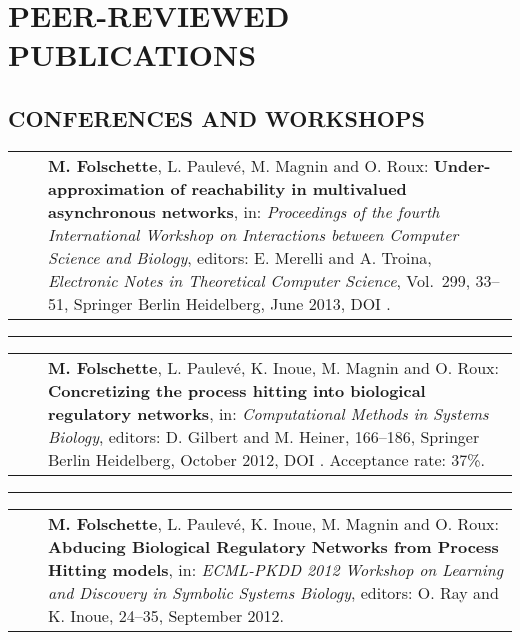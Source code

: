 \documentclass[11pt,a4paper,sans]{moderncv} %
\makeatletter
\renewcommand{\emph}{\textbf}
\newcommand{\myrule}{\vspace*{-2pt}\textcolor{color3}{\rule{\textwidth}{.5pt}}\vspace*{1pt}}
\newcommand{\mybluerule}{\vspace*{5pt}\textcolor{color1}{\rule{\textwidth}{.5pt}}\vspace*{-2pt}}
\newlength{\listitemsymbolwidthsep}
\newenvironment{publist}%
{\begin{tabular}{r@{}p{.935\textwidth}}\hspace{-\listitemsymbolwidthsep}\hspace{.45\hintscolumnwidth}}%
{\end{tabular}}
\newcommand{\newpub}[1]{\vspace{1pt}\begin{publist}\listitemsymbol~~&#1\end{publist}\vspace{1pt}}
\newenvironment{cvsplitsection}[1]{%
  \vspace{1cm}
  \section{#1}%
}{}
\newenvironment{cvsection}[1]{%
  \vspace{1cm}
  \begin{minipage}{\textwidth}
  \section{#1}%
}{%
  \end{minipage}
}
\newenvironment{cvsubsection}[1]{%
  \begin{minipage}{\textwidth}
  \subsection{#1}%
}{%
  \end{minipage}
}
\newcommand{\vol}{Vol.\ }
\makeatother
\begin{document}
\begin{cvsplitsection}{PEER-REVIEWED PUBLICATIONS}

\vspace*{4pt}
\begin{cvsubsection}{CONFERENCES AND WORKSHOPS}

\newpub{\emph{M. Folschette}, L. Paulevé, M. Magnin and O. Roux: %
  \emph{Under-approximation of reachability in multivalued asynchronous networks}, %
  in: \textit{Proceedings of the fourth International Workshop on Interactions between Computer Science and Biology}, editors: E. Merelli and A. Troina, %
  \textit{Electronic Notes in Theoretical Computer Science}, \vol 299,
  33--51, Springer Berlin Heidelberg, June 2013, DOI \httplink[10.1016/j.entcs.2013.11.004]{http://dx.doi.org/10.1016/j.entcs.2013.11.004}.}

\myrule

\newpub{\emph{M. Folschette}, L. Paulevé, K. Inoue, M. Magnin and O. Roux: %
  \emph{Concretizing the process hitting into biological regulatory networks}, %
  in: \textit{Computational Methods in Systems Biology}, editors: D. Gilbert and M. Heiner, %
  166--186, Springer Berlin Heidelberg, October 2012, DOI \httplink[10.1007/978-3-642-33636-2\_11]{dx.doi.org/10.1007/978-3-642-33636-2_11}.
  Acceptance rate: 37\%.}

\myrule

\newpub{\emph{M. Folschette}, L. Paulevé, K. Inoue, M. Magnin and O. Roux:
  \emph{Abducing Biological Regulatory Networks from Process Hitting models},
  in: \textit{ECML-PKDD 2012 Workshop on Learning and Discovery in Symbolic Systems Biology}, editors: O. Ray and K. Inoue, %
  24--35, September 2012.}

\end{cvsubsection}





\end{cvsplitsection}
\end{document}
